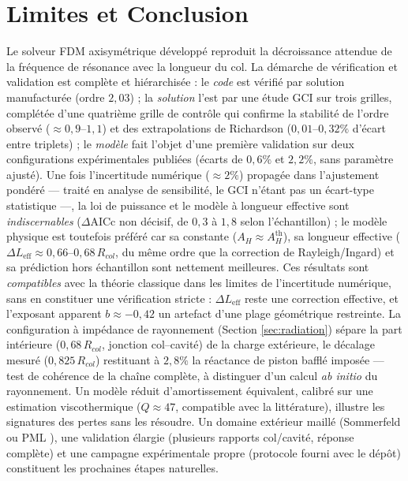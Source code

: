 \documentclass[11pt,a4paper,twocolumn]{article}
\begin{document}
\section{Limites et Conclusion}
Le solveur FDM axisymétrique développé reproduit la décroissance attendue de la fréquence de résonance avec la longueur du col. La démarche de vérification et validation est complète et hiérarchisée : le \emph{code} est vérifié par solution manufacturée (ordre $2{,}03$) ; la \emph{solution} l'est par une étude GCI sur trois grilles, complétée d'une quatrième grille de contrôle qui confirme la stabilité de l'ordre observé ($\approx 0{,}9$–$1{,}1$) et des extrapolations de Richardson ($0{,}01$–$0{,}32\%$ d'écart entre triplets) ; le \emph{modèle} fait l'objet d'une première validation sur deux configurations expérimentales publiées (écarts de $0{,}6\%$ et $2{,}2\%$, sans paramètre ajusté). Une fois l'incertitude numérique ($\approx2\%$) propagée dans l'ajustement pondéré — traité en analyse de sensibilité, le GCI n'étant pas un écart-type statistique —, la loi de puissance et le modèle à longueur effective sont \emph{indiscernables} ($\Delta\text{AICc}$ non décisif, de $0{,}3$ à $1{,}8$ selon l'échantillon) ; le modèle physique est toutefois préféré car sa constante ($A_H\approx A_H^{\mathrm{th}}$), sa longueur effective ($\Delta L_{\mathrm{eff}} \approx 0{,}66$–$0{,}68\,R_{col}$, du même ordre que la correction de Rayleigh/Ingard) et sa prédiction hors échantillon sont nettement meilleures. Ces résultats sont \emph{compatibles} avec la théorie classique dans les limites de l'incertitude numérique, sans en constituer une vérification stricte : $\Delta L_{\mathrm{eff}}$ reste une correction effective, et l'exposant apparent $b \approx -0{,}42$ un artefact d'une plage géométrique restreinte. La configuration à impédance de rayonnement (Section \ref{sec:radiation}) sépare la part intérieure ($0{,}68\,R_{col}$, jonction col–cavité) de la charge extérieure, le décalage mesuré ($0{,}825\,R_{col}$) restituant à $2{,}8\%$ la réactance de piston bafflé imposée — test de cohérence de la chaîne complète, à distinguer d'un calcul \emph{ab initio} du rayonnement. Un modèle réduit d'amortissement équivalent, calibré sur une estimation viscothermique ($Q\approx47$, compatible avec la littérature), illustre les signatures des pertes sans les résoudre. Un domaine extérieur maillé (Sommerfeld ou PML \cite{berenger1994perfectly}), une validation élargie (plusieurs rapports col/cavité, réponse complète) et une campagne expérimentale propre (protocole fourni avec le dépôt) constituent les prochaines étapes naturelles.



\end{document}
